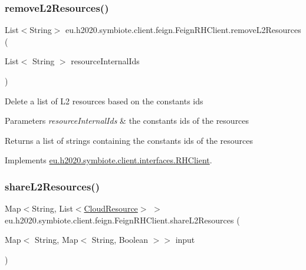 \subsubsection{\texorpdfstring{remove\+L2\+Resources()}{removeL2Resources()}}
{\footnotesize\ttfamily List$<$String$>$ eu.\+h2020.\+symbiote.\+client.\+feign.\+Feign\+R\+H\+Client.\+remove\+L2\+Resources (\begin{DoxyParamCaption}\item[{List$<$ String $>$}]{resource\+Internal\+Ids }\end{DoxyParamCaption})}

Delete a list of L2 resources based on the constants ids


\begin{DoxyParams}{Parameters}
{\em resource\+Internal\+Ids} & the constants ids of the resources \\
\hline
\end{DoxyParams}
\begin{DoxyReturn}{Returns}
a list of strings containing the constants ids of the resources 
\end{DoxyReturn}


Implements \hyperlink{interfaceeu_1_1h2020_1_1symbiote_1_1client_1_1interfaces_1_1RHClient_a8957be63f35e866513383cd20452a374}{eu.\+h2020.\+symbiote.\+client.\+interfaces.\+R\+H\+Client}.

\mbox{\label{classeu_1_1h2020_1_1symbiote_1_1client_1_1feign_1_1FeignRHClient_a2ad028004364f0068c760134a25956b0}} 
\subsubsection{\texorpdfstring{share\+L2\+Resources()}{shareL2Resources()}}
{\footnotesize\ttfamily Map$<$String, List$<$\hyperlink{classeu_1_1h2020_1_1symbiote_1_1cloud_1_1model_1_1internal_1_1CloudResource}{Cloud\+Resource}$>$ $>$ eu.\+h2020.\+symbiote.\+client.\+feign.\+Feign\+R\+H\+Client.\+share\+L2\+Resources (\begin{DoxyParamCaption}\item[{Map$<$ String, Map$<$ String, Boolean $>$$>$}]{input }\end{DoxyParamCaption})}

